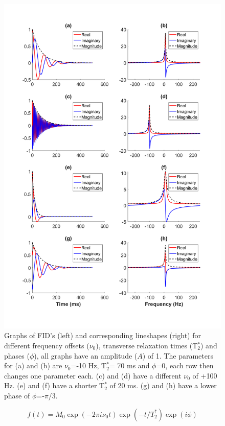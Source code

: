 \documentclass[class=article, crop=false]{standalone}
\begin{document}
\begin{figure}
    \centering
    \includegraphics[width=1\textwidth]{Figures/Theory/FID_Lorentz.png}
    \caption{Graphs of FID's (left) and corresponding lineshapes (right) for different frequency offsets ($\nu_0$), transverse relaxation times (T$_2^*$) and phases ($\phi$), all graphs have an amplitude ($A$) of 1. The parameters for (a) and (b) are $\nu_0$=-10 Hz, T$_2^*$= 70 ms and $\phi$=0, each row then changes one parameter each. (c) and (d) have a different $\nu_0$ of +100 Hz. (e) and (f) have a shorter T$_2^*$ of 20 ms. (g) and (h) have a lower phase of $\phi$=-$\pi$/3.}
    \label{fig:theory:FID_Lorentz}
\end{figure}

\begin{equation}
    f(t) = M_0\exp(-2\pi i \nu_0t)\exp(-t/T_2^*)\exp(i\phi)
    \label{eqn:theory:euler}
\end{equation}
\end{document}
